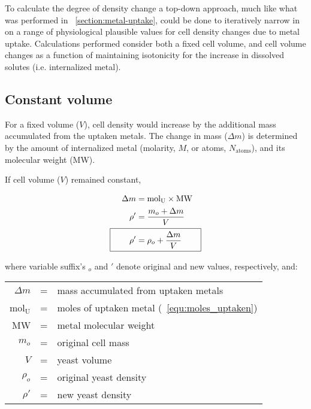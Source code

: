 \documentclass[../main/main]{subfiles}
\begin{document}
To calculate the degree of density change a top-down approach, much like what was performed in \SECTION~\ref{section:metal-uptake}, could be done to iteratively narrow in on a range of physiological plausible values for cell density changes due to metal uptake. Calculations performed consider both a fixed cell volume, and cell volume changes as a function of maintaining isotonicity for the increase in dissolved solutes (i.e. internalized metal).

\subsection*{Constant volume}
\label{subsection:constant-volume-density}
For a fixed volume ($V$), cell density would increase by the additional mass accumulated from the uptaken metals. The change in mass ($\Delta m$) is determined by the amount of internalized metal (molarity, $M$, or atoms, $N_{\text{atoms}}$), and its molecular weight (MW).

\vspace{\baselineskip}
\noindent If cell volume ($V$) remained constant,

\begin{align}
	\Delta m &= \text{mol}_{\text{U}} \times \text{MW}
		\tagaddtext{[\si{\gram}]} \\
	\rho' &= \dfrac{m_o + \Delta m}{V}
		\tagaddtext{[\si{\gram\per\milli\liter}]} \\
	\Aboxed{\qquad
	\rho' &= \rho_o + \dfrac{\Delta m}{V}
		\tagaddtext{[\si{\gram\per\milli\liter}]}
	\qquad}
\end{align}

where variable suffix's $_o$ and $'$ denote original and new values, respectively, and:
\begin{center}
	\begin{tabularx}{.75\textwidth}{r c X}
		$\Delta m$ & = & mass accumulated from uptaken metals \\
		mol$_\text{U}$ & = & moles of uptaken metal (\EQUATION~\ref{equ:moles_uptaken}) \\
		MW & = & metal molecular weight \\
		$m_o$ & = & original cell mass \\
		$V$ & = & yeast volume \\
		$\rho_o$ & = & original yeast density  \\
		$\rho'$ & = & new yeast density
	\end{tabularx}
	\addtocounter{table}{-1}
\end{center}
\end{document}
